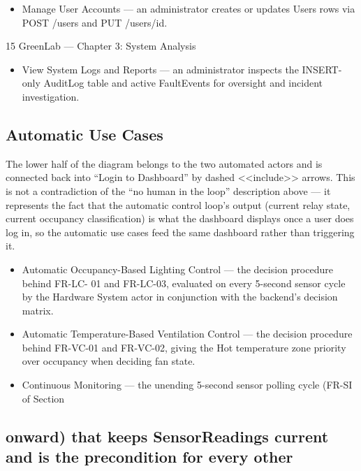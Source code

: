 \begin{itemize}
  \item Manage User Accounts --- an administrator creates or updates Users rows via POST /users
and PUT /users/{id}.
\end{itemize}



15
GreenLab --- Chapter 3: System Analysis


\begin{itemize}
  \item View System Logs and Reports --- an administrator inspects the INSERT-only AuditLog
table and active FaultEvents for oversight and incident investigation.
\end{itemize}

\subsection{Automatic Use Cases}

The lower half of the diagram belongs to the two automated actors and is connected back into
``Login to Dashboard'' by dashed <<include>> arrows. This is not a contradiction of the ``no human
in the loop'' description above --- it represents the fact that the automatic control loop's output
(current relay state, current occupancy classification) is what the dashboard displays once a user
does log in, so the automatic use cases feed the same dashboard rather than triggering it.

\begin{itemize}
  \item Automatic Occupancy-Based Lighting Control --- the decision procedure behind FR-LC-
01 and FR-LC-03, evaluated on every 5-second sensor cycle by the Hardware System actor
in conjunction with the backend's decision matrix.
\end{itemize}

\begin{itemize}
  \item Automatic Temperature-Based Ventilation Control --- the decision procedure behind
FR-VC-01 and FR-VC-02, giving the Hot temperature zone priority over occupancy when
deciding fan state.
\end{itemize}

\begin{itemize}
  \item Continuous Monitoring --- the unending 5-second sensor polling cycle (FR-SI of Section
\end{itemize}
\subsection{onward) that keeps SensorReadings current and is the precondition for every other}

